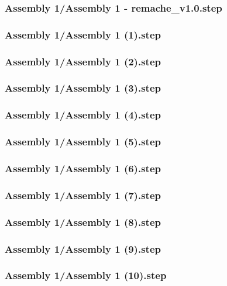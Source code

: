 \documentclass[a4paper,12pt]{article}
\begin{document}
\begin{lstlising}[language=C++]
\subsubsection{Assembly 1/Assembly 1 - remache_v1.0.step}

\subsubsection{Assembly 1/Assembly 1 (1).step}

\subsubsection{Assembly 1/Assembly 1 (2).step}

\subsubsection{Assembly 1/Assembly 1 (3).step}

\subsubsection{Assembly 1/Assembly 1 (4).step}

\subsubsection{Assembly 1/Assembly 1 (5).step}

\subsubsection{Assembly 1/Assembly 1 (6).step}

\subsubsection{Assembly 1/Assembly 1 (7).step}

\subsubsection{Assembly 1/Assembly 1 (8).step}

\subsubsection{Assembly 1/Assembly 1 (9).step}

\subsubsection{Assembly 1/Assembly 1 (10).step}


\end{lstlising}
\end{document}
